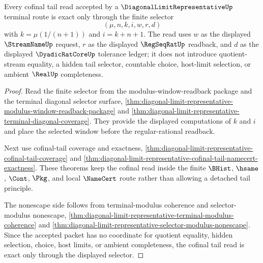 \begin{theorem}
\label{thm:diagonal-limit-representative-cofinal-tail-exactness-lock}
Every cofinal tail read accepted by a $\DiagonalLimitRepresentativeUp$ terminal route is exact only through the finite selector
$$
(\mu,n,k,i,w,r,d)
$$
with $k=\mu(1/(n+1))$ and $i=k+n+1$. The read uses $w$ as the displayed $\StreamNameUp$ request, $r$ as the displayed $\RegSeqRatUp$ readback, and $d$ as the displayed $\DyadicRatCoreUp$ tolerance ledger; it does not introduce quotient-stream equality, a hidden tail selector, countable choice, host-limit selection, or ambient $\RealUp$ completeness.
\end{theorem}
\begin{proof}
Read the finite selector from the modulus-window-readback package and the terminal diagonal selector surface, \autoref{thm:diagonal-limit-representative-modulus-window-readback-package} and \autoref{thm:diagonal-limit-representative-terminal-diagonal-coverage}. They provide the displayed computations of $k$ and $i$ and place the selected window before the regular-rational readback.

Next use cofinal-tail coverage and exactness, \autoref{thm:diagonal-limit-representative-cofinal-tail-coverage} and \autoref{thm:diagonal-limit-representative-cofinal-tail-namecert-exactness}. These theorems keep the cofinal read inside the finite $\BHist$, $\hsame$, $\Cont$, $\Pkg$, and local $\NameCert$ route rather than allowing a detached tail principle.

The nonescape side follows from terminal-modulus coherence and selector-modulus nonescape, \autoref{thm:diagonal-limit-representative-terminal-modulus-coherence} and \autoref{thm:diagonal-limit-representative-selector-modulus-nonescape}. Since the accepted packet has no coordinate for quotient equality, hidden selection, choice, host limits, or ambient completeness, the cofinal tail read is exact only through the displayed selector.
\end{proof}

